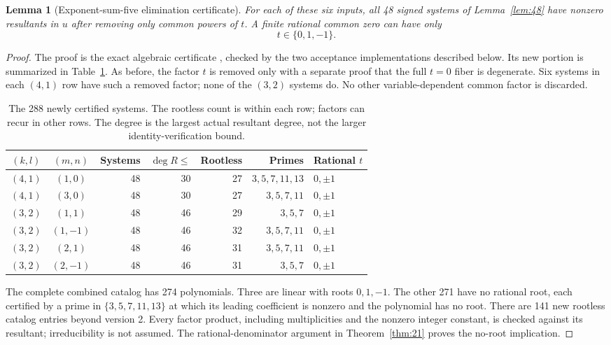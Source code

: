 \documentclass[11pt]{article}
\newtheorem{lemma}[theorem]{Lemma}
\theoremstyle{definition}\newtheorem{definition}[theorem]{Definition}
\theoremstyle{remark}\newtheorem{remark}[theorem]{Remark}
\begin{document}
\begin{lemma}[Exponent-sum-five elimination certificate]\label{lem:degree5data}
For each of these six inputs, all 48 signed systems of Lemma~\ref{lem:48} have nonzero resultants in $u$ after removing only common powers of $t$. A finite rational common zero can have only
\[
t\in\{0,1,-1\}.
\]
\end{lemma}
\begin{proof}
The proof is the exact algebraic certificate , checked by the two acceptance implementations described below. Its new portion is summarized in Table~\ref{tab:degree5}. As before, the factor $t$ is removed only with a separate proof that the full $t=0$ fiber is degenerate. Six systems in each $(4,1)$ row have such a removed factor; none of the $(3,2)$ systems do. No other variable-dependent common factor is discarded.

\begin{table}[ht]
\centering\small
\setlength{\tabcolsep}{5pt}\renewcommand{\arraystretch}{1.18}
\begin{tabular}{ccrrrrl}
\toprule
$(k,l)$ & $(m,n)$ & Systems & $\deg R\le$ & Rootless & Primes & Rational $t$\\
\midrule
$(4,1)$ & $(1,0)$  & 48 & 30 & 27 & $3,5,7,11,13$ & $0,\pm1$\\
$(4,1)$ & $(3,0)$  & 48 & 30 & 27 & $3,5,7,11$ & $0,\pm1$\\
$(3,2)$ & $(1,1)$  & 48 & 46 & 29 & $3,5,7$ & $0,\pm1$\\
$(3,2)$ & $(1,-1)$ & 48 & 46 & 32 & $3,5,7,11$ & $0,\pm1$\\
$(3,2)$ & $(2,1)$  & 48 & 46 & 31 & $3,5,7,11$ & $0,\pm1$\\
$(3,2)$ & $(2,-1)$ & 48 & 46 & 31 & $3,5,7$ & $0,\pm1$\\
\bottomrule
\end{tabular}
\caption{The 288 newly certified systems. The rootless count is within each row; factors can recur in other rows. The degree is the largest actual resultant degree, not the larger identity-verification bound.}\label{tab:degree5}
\end{table}

The complete combined catalog has 274 polynomials. Three are linear with roots $0,1,-1$. The other 271 have no rational root, each certified by a prime in $\{3,5,7,11,13\}$ at which its leading coefficient is nonzero and the polynomial has no root. There are 141 new rootless catalog entries beyond version 2. Every factor product, including multiplicities and the nonzero integer constant, is checked against its resultant; irreducibility is not assumed. The rational-denominator argument in Theorem~\ref{thm:21} proves the no-root implication.


\end{proof}
\end{document}
